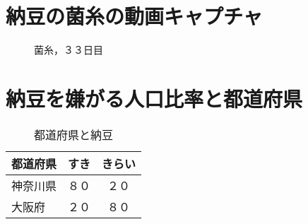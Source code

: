 \appendix

\def\thesection{付録\Alph{section}\\}


\chapter{納豆の菌糸の動画キャプチャ}


\begin{figure}[tb]\centering
\epsfxsize=10cm
\caption{菌糸，３３日目}\label{fig:kinshi33}
\end{figure}

\chapter{納豆を嫌がる人口比率と都道府県}

\begin{table}[tb]\centering
\caption{都道府県と納豆}\label{tab:todoufuken}
\begin{tabular}{lcc}
\hline
都道府県&すき&きらい \\
\hline
神奈川県&８０&２０ \\
大阪府&２０&８０ \\
\hline
\end{tabular}
\end{table}
